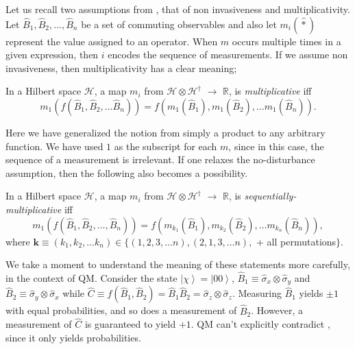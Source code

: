 Let us recall two assumptions from ,
that of non invasiveness and multiplicativity. Let $\hat{B}_{1},\hat{B}_{2},\dots,\hat{B}_{n}$
be a set of commuting observables and also let $m_{i}(\hat{*})$ represent
the value assigned to an operator. When $m$ occurs multiple times
in a given expression, then $i$ encodes the sequence of measurements.
If we assume non invasiveness, then multiplicativity has a clear meaning; 
\begin{defn*}
In a Hilbert space $\mathcal{H}$, a map $m_{i}$ from $\mathcal{H}\otimes\mathcal{H}^{\dagger}$
$\to$ $\mathbb{R}$, is \emph{multiplicative} iff 
\begin{equation}
m_{1}(f(\hat{B}_{1},\hat{B}_{2},\dots\hat{B}_{n}))=f(m_{1}(\hat{B}_{1}),m_{1}(\hat{B}_{2}),\dots m_{1}(\hat{B}_{n})).\label{eq:multiplicativity}
\end{equation}

\end{defn*}
Here we have generalized the notion from simply a product to any arbitrary
function. We have used $1$ as the subscript for each $m$, since
in this case, the sequence of a measurement is irrelevant. If one
relaxes the no-disturbance assumption, then the following also becomes
a possibility.
\begin{defn*}
In a Hilbert space $\mathcal{H}$, a map $m_{i}$ from $\mathcal{H}\otimes\mathcal{H}^{\dagger}$
$\to$ $\mathbb{R}$, is \emph{sequentially-multiplicative} iff 
\begin{equation}
m_{1}(f(\hat{B}_{1},\hat{B}_{2},\dots,\hat{B}_{n}))=f(m_{k_{1}}(\hat{B}_{1}),m_{k_{2}}(\hat{B}_{2}),\dots m_{k_{n}}(\hat{B}_{n})),\label{eq:seqMultiplicativity}
\end{equation}
where $\mathbf{k}\equiv(k_{1},k_{2},\dots k_{n})\in\{(1,2,3,\dots n),(2,1,3,\dots n),$
+ all permutations$\}$.
\end{defn*}
We take a moment to understand the meaning of these statements more
carefully, in the context of QM. Consider the state $\left|\chi\right\rangle =\left|00\right\rangle $,
$\hat{B}_{1}\equiv\hat{\sigma}_{x}\otimes\hat{\sigma}_{y}$ and $\hat{B}_{2}\equiv\hat{\sigma}_{y}\otimes\hat{\sigma}_{x}$
while $\hat{C}\equiv f(\hat{B}_{1},\hat{B}_{2})=\hat{B}_{1}\hat{B}_{2}=\hat{\sigma}_{z}\otimes\hat{\sigma}_{z}$.
Measuring $\hat{B}_{1}$ yields $\pm1$ with equal probabilities,
and so does a measurement of $\hat{B}_{2}$. However, a measurement
of $\hat{C}$ is guaranteed to yield $+1$. QM can't explicitly contradict
, since it only yields probabilities.
